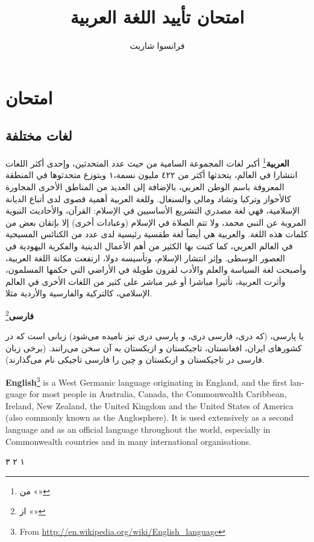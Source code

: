 \documentclass[a4paper]{book}%
\title{امتحان تأييد اللغة العربية}
\author{فرانسوا شاريت}
\begin{document}
\maketitle
\tableofcontents
\chapter{امتحان}
\section{لغات مختلفة}


\textbf{العربية}\footnote{%
من «»} 
أكبر لغات المجموعة السامية من حيث عدد المتحدثين، وإحدى أكثر اللغات انتشارا في
العالم، يتحدثها أكثر من ٤٢٢ مليون نسمة،١ ويتوزع متحدثوها في المنطقة المعروفة
باسم الوطن العربي، بالإضافة إلى العديد من المناطق الأخرى المجاورة كالأحواز وتركيا
وتشاد ومالي والسنغال. وللغة العربية أهمية قصوى لدى أتباع الديانة الإسلامية، فهي
لغة مصدري التشريع الأساسيين في الإسلام: القرآن، والأحاديث النبوية المروية عن النبي
محمد، ولا تتم الصلاة في الإسلام (وعبادات أخرى) إلا بإتقان بعض من كلمات هذه اللغة.
والعربية هي أيضاً لغة طقسية رئيسية لدى عدد من الكنائس المسيحية في العالم العربي،
كما كتبت بها الكثير من أهم الأعمال الدينية والفكرية اليهودية في العصور الوسطى.
وإثر انتشار الإسلام، وتأسيسه دولا، ارتفعت مكانة اللغة العربية، وأصبحت لغة السياسة
والعلم والأدب لقرون طويلة في الأراضي التي حكمها المسلمون، وأثرت العربية، تأثيرا
مباشرا أو غير مباشر على كثير من اللغات الأخرى في العالم الإسلامي، كالتركية
والفارسية والأردية مثلا.

\textfarsi{\bfseries فارسی}\footnote{%
از «»}
\begin{farsi}
یا پارسی، (که دری، فارسی دری، و پارسی دری نیز نامیده می‌شود) زبانی است که
در کشورهای ایران، افغانستان، تاجیکستان و ازبکستان به آن سخن می‌رانند.
(برخی زبان فارسی در تاجیکستان و ازبکستان و چین را فارسی تاجیکی نام
می‌گذارند).  
\end{farsi}

\newpage
\begin{english}
\textbf{English}\footnote{%
	From \url{http://en.wikipedia.org/wiki/English_language}} 
is a West Germanic language originating in England, and the first language for
most people in Australia, Canada, the Commonwealth Caribbean, Ireland, New
Zealand, the United Kingdom and the United States of America (also commonly
known as the Anglosphere). It is used extensively as a second language and as
an official language throughout the world, especially in Commonwealth countries
and in many international organisations.

\textarabic{١ ٢ ٣}

\end{english}
\clearpage
\end{document}
